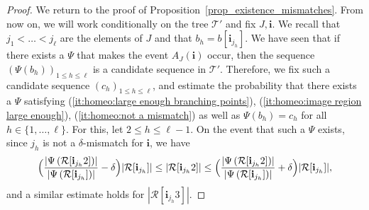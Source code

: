 \documentclass[11pt]{article}
\newcommand{\Rr}{\mathcal{R}}
\newcommand{\ii}{\mathbf{i}}
\theoremstyle{plain}
\theoremstyle{definition}
\numberwithin{equation}{section}
\begin{document}
\begin{proof}
We return to the proof of Proposition~\ref{prop_existence_mismatches}.
From now on, we will work conditionally on the tree $\mathcal{T'}$ and fix $J,\ii$.
We recall that $j_1<\dots<j_{\ell}$ are the elements of $J$ and that $b_h=b[\ii_{j_h}]$.
We have seen that if there exists a $\Psi$ that makes the event $A_J(\ii)$ occur, then the sequence $\left( \Psi(b_h) \right)_{1 \leq h \leq \ell}$ is a candidate sequence in $\mathcal{T}'$.
Therefore, we fix such a candidate sequence $(c_h)_{1 \leq h \leq \ell}$, and estimate the probability that there exists a $\Psi$ satisfying (\ref{it:homeo:large enough branching points}), (\ref{it:homeo:image region large enough}), (\ref{it:homeo:not a mismatch}) as well as $\Psi(b_h)=c_h$ for all $h\in\{1,\dots,\ell\}$.
For this, let $2 \leq h \leq \ell-1$.
On the event that such a $\Psi$ exists, since $j_h$ is not a $\delta$-mismatch for $\ii$, we have
\begin{equation}\label{eqn:absence_mismatch}
\Bigl( \frac{ \left| \Psi \left( \Rr[\ii_{j_h}2] \right) \right|}{\left| \Psi \left( \Rr[\ii_{j_h}] \right) \right|}-\delta \Bigr) |\Rr[\ii_{j_h}] | \leq \left| \Rr[\ii_{j_h}2] \right| \leq \Bigl( \frac{ \left| \Psi \left( \Rr[\ii_{j_h}2] \right) \right|}{\left| \Psi \left( \Rr[\ii_{j_h}] \right) \right|}+\delta \Bigr) |\Rr[\ii_{j_h}] |,
\end{equation}
and a similar estimate holds for $\left| \Rr[\ii_{j_h}3] \right|$.


\end{proof}
\end{document}
